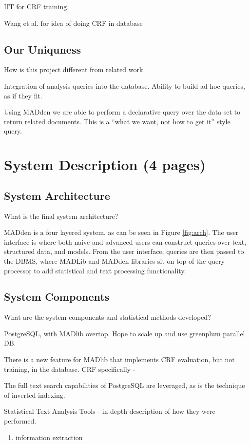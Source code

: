 \documentclass{article}
\newcommand{\system}{MADden\xspace}
\begin{document}
\begin{enumerate}
  IIT for CRF training.

  Wang et al. for idea of doing CRF in database

  \subsection{Our Uniquness}
  How is this project different from related work

  Integration of analysis queries into the database.
  Ability to build ad hoc queries, as if they fit.

  Using {\system} we are able to perform a declarative query over the data set to return related documents.
  This is a ``what we want, not how to get it'' style query.

  \section{System Description (4 pages)}
  \subsection{System Architecture}
  What is the final system architecture?

  {\system} is a four layered system, as can be seen in Figure \ref{fig:arch}.
  The user interface is where both naive and advanced users can construct queries over text, structured data, and models.
  From the user interface,
  queries are then passed to the DBMS,
  where MADLib and {\system} libraries sit on top of the query processor to add statistical and text processing functionality.


  \subsection{System Components}
  What are the system components and statistical methods developed?

  PostgreSQL, with MADlib overtop.
  Hope to scale up and use greenplum parallel DB.

  There is a new feature for MADlib that implements CRF evaluation, but not training, in the database.
  CRF specifically -

  The full text search capabilities of PostgreSQL are leveraged,
  as is the technique of inverted indexing.


  Statistical Text Analysis Tools - in depth description of how they were performed.
  \begin{enumerate}
  \item information extraction


\end{enumerate}
\end{enumerate}
\end{document}
